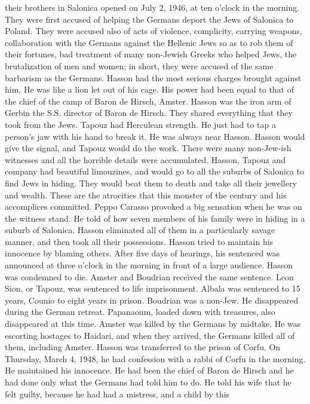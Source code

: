 their brothers in Salonica opened on July 2, 1946, at ten o'clock in the 
morning. They were first accused of helping the Germans deport the Jews 
of Salonica to Poland. They were accused also of acts of violence, complicity, carrying weapons, collaboration with the Germans against the 
Hellenic Jews so as to rob them of their fortunes, bad treatment of many 
non-Jewish Greeks who helped Jews, the brutalization of men and women; 
in short, they were accused of the same barbarism as the Germans. Hasson had the most serious charges brought against him. He was like a lion let out of his cage. His power had been equal to that of the chief of
the camp of Baron de Hirsch, Amster. Hasson was the iron arm of Gerbin 
the S.S. director of Baron de Hirsch. They shared everything that they 
took from the Jews. 
Tapouz had Herculean strength. He just had to tap a person's jaw 
with his hand to break it. He was always near Hasson. Hasson would 
give the signal, and Tapouz would do the work. There were many non-Jew-ish witnesses and all the horrible details were accumulated. Hasson, Tapouz and company had beautiful limouzines, and would go to all the suburbs of Salonica to find Jews in hiding. They would beat them to death 
and take all their jewellery and wealth. These are the atrocities that 
this monster of the century and his accomplices committed. 
Peppo Carasso provoked a big sensation when he was on the witness 
stand. He told of how seven members of his family were in hiding in a 
suburb of Salonica. Hasson eliminated all of them in a particularly savage manner, and then took all their possessions. 
Hasson tried to maintain his innocence by blaming others. After 
five days of hearings, his sentenced was announced at three o'clock in 
the morning in front of a large audience. Hasson was condemned to die.
 Amster and Boudrian received the same sentence. Leon Sion, or Tapouz, 
was sentenced to life imprisonment. Albala was sentenced to 15 years, 
Counio to eight years in prison. Boudrian was a non-Jew. He disappeared during the German retreat. Papanaoum, loaded down with treasures, 
also disappeared at this time. Amster was killed by the Germans by midtake. He was escorting hostages to Haidari, and when they arrived, the 
Germans killed all of them, including Amster. 
Hasson was transferred to the prison of Corfu. On Thursday, March 
4, 1948, he had confession with a rabbi of Corfu in the morning. He 
maintained his innocence. He had been the chief of Baron de Hirsch and 
he had done only what the Germans had told him to do. He told his wife 
that he felt guilty, because he had had a mistress, and a child by this 
